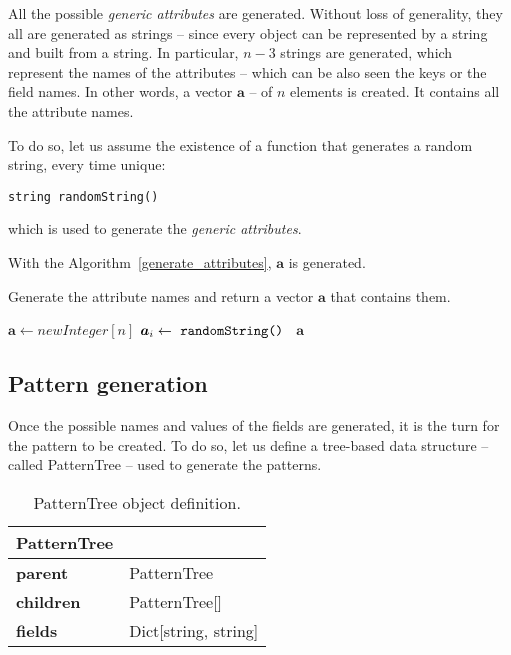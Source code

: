 \documentclass{acm_proc_article-sp-sigmod09}
\begin{document}
All the possible \emph{generic attributes} are generated. Without loss of generality, they all are generated as strings -- since every object can be represented by a string and built from a string. In particular, $n - 3$ strings are generated, which represent the names of the attributes -- which can be also seen the keys or the field names. In other words, a vector $\boldsymbol{a}$ -- of $n$ elements is created. It contains all the attribute names.

To do so, let us assume the existence of a function that generates a random string, every time unique:
\begin{verbatim}
string randomString()
\end{verbatim}
which is used to generate the \emph{generic attributes}.

With the Algorithm~\ref{generate_attributes}, $\boldsymbol{a}$ is generated.
\begin{algorithm}
\caption{Generate the attribute names and return a vector $\boldsymbol{a}$ that contains them.}
\label{generate_attributes}
\begin{algorithmic}[1]
\State $\boldsymbol{a} \gets new Integer[n]$
	\State $\boldsymbol{a}_i \gets \text{ \texttt{randomString() }} $ 
\EndFor
\Return $\boldsymbol{a}$
\EndFunction
\end{algorithmic}
\end{algorithm}

\subsection{Pattern generation}
Once the possible names and values of the fields are generated, it is the turn for the pattern to be created. To do so, let us define a tree-based data structure -- called PatternTree -- used to generate the patterns.

\begin{table}[H]
\centering
\begin{tabular}{|ll|} \hline
\textbf{PatternTree} & \\ \hline
\textbf{parent} & PatternTree \\ \hline
\textbf{children} & PatternTree[] \\ \hline
\textbf{fields} & Dict[string, string] \\
\hline\end{tabular}
\caption{PatternTree object definition.}
\label{tab:patterntree}
\end{table}
\end{document}
